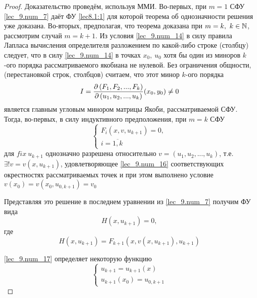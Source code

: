 \documentclass[../../main.tex]{subfiles}
\begin{document}
\begin{proof}
    Доказательство проведём, используя ММИ.
    Во-первых, при $m = 1$ СФУ \eqref{lec_9.num_7} 
    даёт ФУ \eqref{lec8.1:1} для которой теорема об
    однозначности решения уже доказана.
    Во-вторых, предполагая, что теорема доказана
    при $m = k,\ k \in \mathbb{N}$, рассмотрим случай
    $m = k + 1$.
    Из условия \eqref{lec_9.num_14} в силу правила Лапласа
    вычисления определителя разложением по какой-либо
    строке (столбцу) следует, что в силу \eqref{lec_9.num_14} 
    в точках $x_0,\ u_0$ хотя бы один из миноров 
    $k$-ого порядка рассматриваемого якобиана не нулевой.
    Без ограничения общности,(перестановкой строк, столбцов)
    считаем, что этот минор $k$-ого порядка
    \begin{equation}
        \label{lec_9.num_15}
        I = \frac{\partial \left(F_1, F_2, ..., F_k\right)}{\partial \left(u_1, u_2, ..., u_k\right)}(x_0, y_0) \neq 0
    \end{equation}
    является главным угловым минором матрицы Якоби, рассматриваемой
    СФУ. Тогда, во-первых, в силу индуктивного
    предположения, при $m = k$ СФУ
    \begin{equation}
        \label{lec_9.num_16}
        \begin{cases}
            F_i\left(x, v, u_{k+1}\right) = 0, \\
            i = \overline{1, k}
        \end{cases}
    \end{equation}
    для $fix\ u_{k+1}$ однозначно разрешена относительно 
    $v = \left(u_1, u_2, ..., u_k\right)$, т.е. 
    $\exists!v = v\left(x, u_{k+1}\right)$, удовлетворяющее
    \eqref{lec_9.num_16} соответствующих окрестностях
    рассматриваемых точек и при этом выполнено условие\
    $v\left(x_0\right) = v\left(x_0, u_{0,k+1}\right) = v_0$
    
    Представляя это решение в последнем уравнении из
    \eqref{lec_9.num_7} получим ФУ вида
    \begin{equation}
        \label{lec_9.num_17}
        H(x, u_{k+1}) = 0,
    \end{equation}
    где
    \begin{equation}
        \label{lec_9.num_18}
        H\left(x, u_{k+1}\right) = 
        F_{k+1}\left(x, v\left(x, u_{k+1}\right), 
        u_{k+1}\right)
    \end{equation}
    
    \eqref{lec_9.num_17} определяет некоторую функцию
    \begin{equation}
        \label{lec_9.num_19}
        \begin{cases}
        u_{k+1} = u_{k+1}\left(x\right)\\
        u_{k+1}\left(x_0\right) = u_{0,k+1}
        \end{cases}
    \end{equation}
    

\end{proof}
\end{document}
